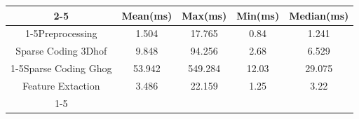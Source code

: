 \documentclass{standalone}
\begin{document}
 
 \begin{tabular}{|c |c |c |c |c |}
\cline{2-5}\cline{2-5} \multicolumn{1}{c |}{ } & Mean(ms) & Max(ms) & Min(ms) & Median(ms)\\ 
\cline{1-5}Preprocessing & 1.504 & 17.765 & 0.84 & 1.241\\ 
 \hhline{|=|=|=|=|=|}Sparse Coding 3Dhof & 9.848 & 94.256 & 2.68 & 6.529\\ 
 \cline{1-5}Sparse Coding Ghog & 53.942 & 549.284 & 12.03 & 29.075\\ 
 \hhline{|=|=|=|=|=|}Feature Extaction & 3.486 & 22.159 & 1.25 & 3.22\\ 
 \cline{1-5}\hline \end{tabular}
 
\end{document}
